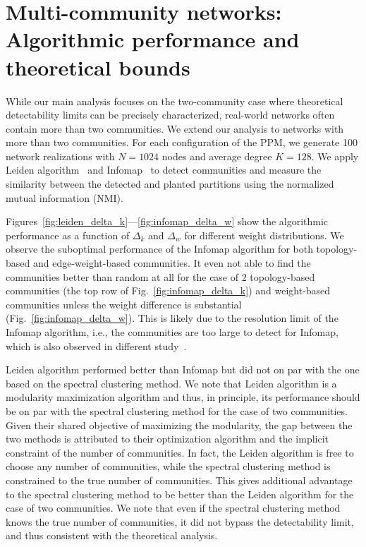 \documentclass[a4paper,pre,superscriptaddress,floatfix,nofootinbib,twocolumn]{revtex4-1}
\begin{document}
\section{Multi-community networks: Algorithmic performance and theoretical bounds}
\label{sec:multi_community}

While our main analysis focuses on the two-community case where theoretical detectability limits can be precisely characterized, real-world networks often contain more than two communities.
We extend our analysis to networks with more than two communities. For each configuration of the PPM, we generate 100 network realizations with $N = 1024$ nodes and average degree $K = 128$. We apply Leiden algorithm~\cite{traag2019louvain} and Infomap~\cite{rosvall2008maps} to detect communities and measure the similarity between the detected and planted partitions using the normalized mutual information (NMI).

Figures~\ref{fig:leiden_delta_k}---\ref{fig:infomap_delta_w} show the algorithmic performance as a function of $\Delta_k$ and $\Delta_w$ for different weight distributions. We observe the suboptimal performance of the Infomap algorithm for both topology-based and edge-weight-based communities.
It even not able to find the communities better than random at all for the case of 2 topology-based communities (the top row of Fig.~\ref{fig:infomap_delta_k}) and weight-based communities unless the weight difference is substantial (Fig.~\ref{fig:infomap_delta_w}).
This is likely due to the resolution limit of the Infomap algorithm, i.e., the communities are too large to detect for Infomap, which is also observed in different study~\cite{kojaku2024network}.

Leiden algorithm performed better than Infomap but did not on par with the one based on the spectral clustering method. We note that Leiden algorithm is a modularity maximization algorithm and thus, in principle, its performance should be on par with the spectral clustering method for the case of two communities.
Given their shared objective of maximizing the modularity, the gap between the two methods is attributed to their optimization algorithm and the implicit constraint of the number of communities. In fact, the Leiden algorithm is free to choose any number of communities, while the spectral clustering method is constrained to the true number of communities. This gives additional advantage to the spectral clustering method to be better than the Leiden algorithm for the case of two communities. We note that even if the spectral clustering method knows the true number of communities, it did not bypass the detectability limit, and thus consistent with the theoretical analysis.
\end{document}
